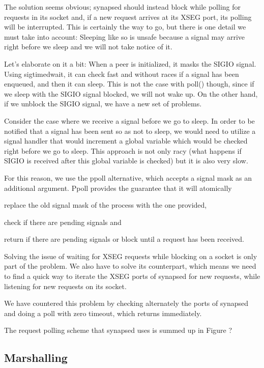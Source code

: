 The solution seems obvious; synapsed should instead block while polling for 
requests in its socket and, if a new request arrives at its XSEG port, its 
polling will be interrupted. This is certainly the way to go, but there is one
detail we must take into account: Sleeping like so is unsafe because a signal 
may arrive right before we sleep and we will not take notice of it.

Let's elaborate on it a bit: When a peer is initialized, it masks the SIGIO 
signal. Using sigtimedwait, it can check fast and without races if a signal has 
been enqueued, and then it can sleep. This is not the case with poll() though, 
since if we sleep with the SIGIO signal blocked, we will not wake up. On the 
other hand, if we unblock the SIGIO signal, we have a new set of problems.

Consider the case where we receive a signal before we go to sleep. In order to 
be notified that a signal has been sent so as not to sleep, we would need to 
utilize a signal handler that would increment a global variable which would be 
checked right before we go to sleep. This approach is not only racy (what 
happens if SIGIO is received after this global variable is checked) but it is 
also very slow.

For this reason, we use the ppoll alternative, which accepts a signal mask as 
an additional argument. Ppoll provides the guarantee that it will atomically 
\begin{inparaenum}[i.]
\item replace the old signal mask of the process with the one provided,
\item check if there are pending signals and
\item return if there are pending signals or block until a request has been 
	received.
\end{inparaenum}

Solving the issue of waiting for XSEG requests while blocking on a socket is 
only part of the problem. We also have to solve its counterpart, which means we 
need to find a quick way to iterate the XSEG ports of synapsed for new 
requests, while listening for new requests on its socket.

We have countered this problem by checking alternately the ports of synapsed 
and doing a poll with zero timeout, which returns immediately.

The request polling scheme that synapsed uses is summed up in Figure ?

\subsection{Marshalling}

